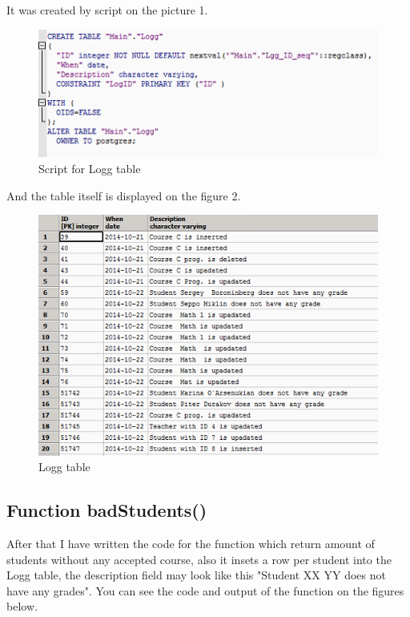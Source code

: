 \documentclass[english]{article}
\begin{document}
It was created by script on the picture 1.

\begin{figure}[hb]
\centerline{\includegraphics{PLPGSQL/LoggScript}}
\caption{Script for Logg table}
\end{figure}


And the table itself is displayed on the figure 2.


\begin{figure}[hb]
\centerline{\includegraphics{PLPGSQL/LoggTable}}
\caption{Logg table}
\end{figure}

\subsection{Function badStudents()}
After that I have written the code for the function which return amount of students without any accepted course, also it insets a row per student into the Logg table, the description field may look like this "Student XX YY does not have any grades". You can see the code and output of the function on the figures below.
\end{document}
